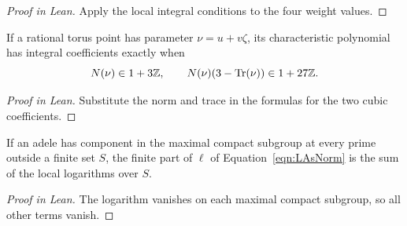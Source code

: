 \begin{proof}[Proof in Lean]

\leanok


Apply the local integral conditions to the four weight values.

\end{proof}

\begin{supportinglemma}

\label{helper:integralCoefficients}


\leanok

If a rational torus point has parameter $\nu=u+v\zeta$, its characteristic polynomial has integral coefficients exactly when \[N(\nu)\in1+3\mathbb{Z},\qquad N(\nu)(3-\operatorname{Tr}(\nu))\in1+27\mathbb{Z}.\]

\end{supportinglemma}

\begin{proof}[Proof in Lean]

\leanok

Substitute the norm and trace in the formulas for the two cubic coefficients.

\end{proof}

\begin{supportinglemma}

\label{helper:adelicLogarithm}


\leanok

If an adele has component in the maximal compact subgroup at every prime outside a finite set $S$, the finite part of $\ell$ of Equation~\ref{eqn:LAsNorm} is the sum of the local logarithms over $S$.

\end{supportinglemma}

\begin{proof}[Proof in Lean]

\leanok

The logarithm vanishes on each maximal compact subgroup, so all other terms vanish.

\end{proof}

